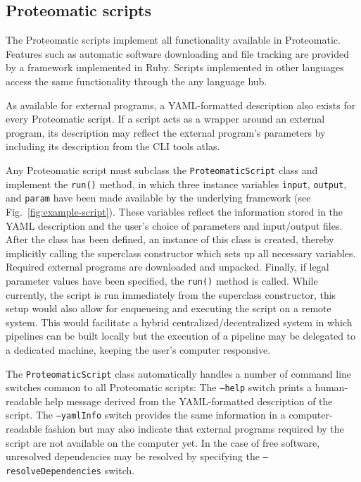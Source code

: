 \subsection{Proteomatic scripts}

The Proteomatic scripts implement all functionality available in Proteomatic.
Features such as automatic software downloading and file tracking are provided
by a framework implemented in Ruby.
Scripts implemented in other languages access the same functionality through
the any language hub.

As available for external programs, a YAML-formatted description also exists for 
every Proteomatic script. 
If a script acts as a wrapper around an external program, its description may 
reflect the external program's parameters by including its description from 
the CLI tools atlas.

Any Proteomatic script must subclass the {\tt ProteomaticScript} class and 
implement the {\tt run()} method, in which three instance variables {\tt input}, 
{\tt output}, and {\tt param} have been made available by the underlying 
framework (see Fig.~\ref{fig:example-script}).
These variables reflect the information stored in the YAML description and the 
user's choice of parameters and input/output files. 
After the class has been defined, an instance of this class is created, 
thereby implicitly calling the superclass constructor which sets up all
necessary variables.
Required external programs are downloaded and unpacked.
Finally, if legal parameter values have been specified, the {\tt run()} method
is called.
While currently, the script is run immediately from the superclass 
constructor, this setup would also allow for enqueueing and executing the script
on a remote system.
This would facilitate a hybrid centralized/decentralized system in which 
pipelines can be built locally but the execution of a pipeline may be delegated 
to a dedicated machine, keeping the user's computer responsive.

The {\tt ProteomaticScript} class automatically handles a number of command line 
switches common to all Proteomatic scripts:
The {\tt --help} switch prints a human-readable help message derived from
the YAML-formatted description of the script. 
The {\tt ---yamlInfo} switch provides the same information in a computer-readable 
fashion but may also indicate that external programs required by the script are
not available on the computer yet.
In the case of free software, unresolved dependencies may be resolved by specifying 
the {\tt --resolveDependencies} switch.


